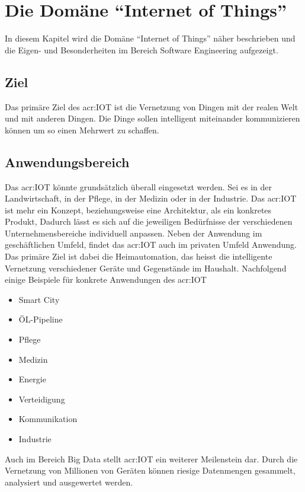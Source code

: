 \chapter{Die Domäne "`Internet of Things"'}
In diesem Kapitel wird die Domäne "`Internet of Things"' näher beschrieben und die Eigen- und Besonderheiten im Bereich Software Engineering aufgezeigt.

\section{Ziel}
Das primäre Ziel des \gls{acr:IOT} ist die Vernetzung von Dingen mit der realen Welt und mit anderen Dingen. Die Dinge sollen intelligent miteinander kommunizieren können um so einen Mehrwert zu schaffen. 

\section{Anwendungsbereich}
Das \gls{acr:IOT} könnte grundsätzlich überall eingesetzt werden. Sei es in der Landwirtschaft, in der Pflege, in der Medizin oder in der Industrie. Das \gls{acr:IOT} ist mehr ein Konzept, beziehungsweise eine Architektur, als ein konkretes Produkt, Dadurch lässt es sich auf die jeweiligen Bedürfnisse der verschiedenen Unternehmensbereiche individuell anpassen. Neben der Anwendung im geschäftlichen Umfeld, findet das \gls{acr:IOT} auch im privaten Umfeld Anwendung. Das primäre Ziel ist dabei die Heimautomation, das heisst die intelligente Vernetzung verschiedener Geräte und Gegenstände im Haushalt. Nachfolgend einige Beispiele für konkrete Anwendungen des \gls{acr:IOT}

\begin{itemize}
\item Smart City
\item ÖL-Pipeline
\item Pflege
\item Medizin
\item Energie
\item Verteidigung
\item Kommunikation
\item Industrie
\end{itemize}

Auch im Bereich Big Data stellt \gls{acr:IOT} ein weiterer Meilenstein dar. Durch die Vernetzung von Millionen von Geräten können riesige Datenmengen gesammelt, analysiert und ausgewertet werden.



